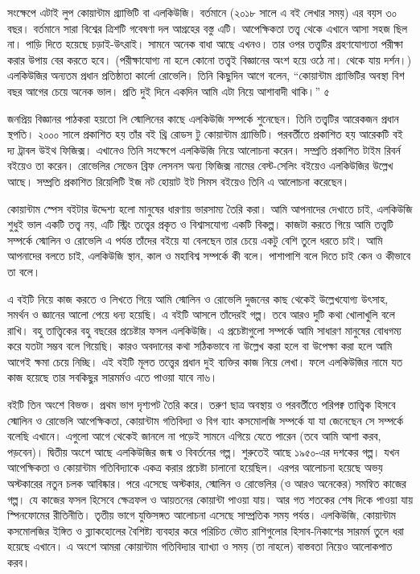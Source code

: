 \documentclass[
  letterpaper,
  DIV=11,
  numbers=noendperiod]{scrreprt}
\begin{document}
সংক্ষেপে এটাই লুপ কোয়ান্টাম গ্র্যাভিটি বা এলকিউজি। বর্তমানে (২০১৮ সালে এ বই
লেখার সময়) এর বয়স ৩০ বছর। বর্তমানে সারা বিশ্বের ত্রিশটি গবেষণা দল আগ্রহের
বস্তু এটি। আপেক্ষিকতা তত্ত্ব থেকে এখানে আসা সহজ ছিল না। পাড়ি দিতে হয়েছে
চড়াই-উৎরাই। সামনে অনেক বাধা আছে এখনও। তার ওপর তত্ত্বটির গ্রহণযোগ্যতা পরীক্ষা
করার উপায় বের করতে হবে। (পরীক্ষাযোগ্য না হলে কোনো তত্ত্বই বিজ্ঞানের অংশ হয়ে
ওঠে না। থেকে যায় দর্শন।) এলকিউজির অন্যতম প্রধান প্রতিষ্ঠাতা কার্লো রোভেলি।
তিনি কিছুদিন আগে বলেন, ``কোয়ান্টাম গ্র্যাভিটির অবস্থা বিশ বছর আগের চেয়ে অনেক
ভাল। প্রতি দুই দিনে একদিন আমি এটা নিয়ে আশাবাদী থাকি।'' ৫

জনপ্রিয় বিজ্ঞানর পাঠকরা হয়তো লি স্মোলিনের কাছে এলকিউজি সম্পর্কে শুনেছেন। তিনি
তত্ত্বটির আরেকজন প্রধান স্থপতি। ২০০০ সালে প্রকাশিত হয় তাঁর বই থ্রি রোডস টু
কোয়ান্টাম গ্র্যাভিটি। পরবর্তীতে প্রকাশিত হয় আরেকটি বই দ্য ট্রাবল উইথ ফিজিক্স।
এখানেও তিনি সংক্ষেপে এলকিউজি নিয়ে আলোচনা করেন। সম্প্রতি প্রকাশিত টাইম রিবর্ন
বইয়েও তা করেন। রোভেলির সেভেন ব্রিফ লেসনস অন্য ফিজিক্স নামের বেস্ট-সেলিং
বইয়েও এলকিউজির উল্লেখ আছে। সম্প্রতি প্রকাশিত রিয়েলিটি ইজ নট হোয়াট ইট সিমস
বইয়েও তিনি এ আলোচনা করেছেন।

কোয়ান্টাম স্পেস বইটার উদ্দেশ্য হলো মানুষের ধারণায় ভারসাম্য তৈরি করা। আমি
আপনাদের দেখাতে চাই, এলকিউজি শুধুই ভাল একটি তত্ত্ব নয়, এটি স্ট্রিং তত্ত্বের প্রকৃত
ও বিশ্বাসযোগ্য একটি বিকল্প। কাজটা করতে গিয়ে আমি তত্ত্বটি সম্পর্কে স্মোলিন ও
রোভেলি এ পর্যন্ত তাঁদের বইয়ে যা বেলছেন তার চেয়ে একটু বেশি তুলে ধরতে চাই। আমি
আপনাদের বলতে চাই, এলকিউজি স্থান, কাল ও মহাবিশ্ব সম্পর্কে কী বলে। পাশাপাশি
বলে দিতে চাই কেন ও কীভাবে তা বলে।

এ বইটি নিয়ে কাজ করতে ও লিখতে গিয়ে আমি স্মোলিন ও রোভেলি দুজনের কাছ থেকেই
উল্লেখযোগ্য উৎসাহ, সমর্থন ও জ্ঞানের আলো পেয়ে ধন্য হয়েছি। এ বইটি আসলে তাঁদেরই
গল্প। তবে আরও দুটি কথা খোলাখুলি বলে রাখি। বহু তাত্ত্বিকের বহু বছরের প্রচেষ্টার
ফসল এলকিউজি। এ প্রচেষ্টাগুলো সম্পর্কে আমি সাধারণ মানুষের বোধগম্য করে যতটা সম্ভব
বলে গিয়েছি। কারও অবদানের কথা সঠিকভাবে না উল্লেখ করা হলে বা উপেক্ষা করা হলে
আমি আগেই ক্ষমা চেয়ে নিচ্ছি। এই বইটি মূলত তত্ত্বের প্রধান দুই ব্যক্তির কাজ নিয়ে
লেখা। ফলে এলকিউজির নামে যত কাজ হয়েছে তার সবকিছুর সারমর্মও এতে পাওয়া যাবে
না৬।

বইটি তিন অংশে বিভক্ত। প্রথম ভাগ দৃশ্যপট তৈরি করে। তরুণ ছাত্র অবস্থায় ও পরবর্তীতে
পরিপক্ব তাত্ত্বিক হিসবে স্মোলিন ও রোভেলি আপেক্ষিকতা, কোয়ান্টাম গতিবিদ্যা ও বিগ
ব্যাং কসমোলজি সম্পর্কে যা যা জেনেছেন সে সম্পর্কে বলেছি এখানে। এগুলো আগে থেকেই
জানলে না পড়েই সামনে এগিয়ে যেতে পারেন (তবে আমি আশা করব, পড়বেন)। দ্বিতীয়
অংশে আছে এলকিউজির জন্ম ও বিবর্তনের গল্প। শুরুতেই আছে ১৯৫০-এর দশকের গল্প। যখন
আপেক্ষিকতা ও কোয়ান্টাম গতিবিদ্যাকে একত্র করার প্রচেষ্টা চালানো হয়েছিল। এরপর
আলোচনা হয়েছে অভয় অস্টকারের নতুন চলক আবিষ্কার। পরে এসেছে অস্টকার, স্মোলিন ও
রোভেলির (ও আরও অনেকের) সমন্বিত কাজের গল্প। যে কাজের ফসল হিসেবে ক্ষেত্রফল ও
আয়তনের কোয়ান্টা পাওয়া যায়। আর গত শতকের শেষ দিকে পাওয়া যায় স্পিনফোমের
রীতিনীতি। তৃতীয় ভাগে যুক্তিসঙ্গত আলোচনা এসেছে সাম্প্রতিক সময় পর্যন্ত। এলকিউজি,
কোয়ান্টাম কসমোলজির ইঙ্গিত ও ব্ল্যাকহোলের বৈশিষ্ট্য ব্যবহার করে পরিচিত ভৌত
রাশিগুলোর হিসাব-নিকাশের সারমর্ম তুলে ধরা হয়েছে এখানে। এ অংশে আমরা কোয়ান্টাম
গতিবিদ্যার ব্যাখ্যা ও সময় (তা নাহলে) বাস্তবতা নিয়েও আলোকপাত করব।
\end{document}
